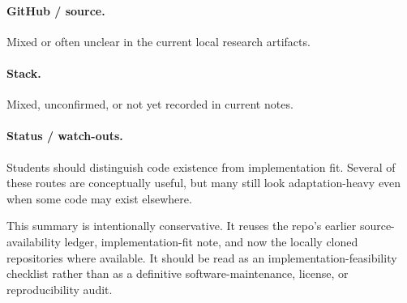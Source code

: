 \documentclass[11pt]{report}
\begin{document}
\paragraph{GitHub / source.}
Mixed or often unclear in the current local research artifacts.

\paragraph{Stack.}
Mixed, unconfirmed, or not yet recorded in current notes.

\paragraph{Status / watch-outs.}
Students should distinguish code existence from implementation fit.  Several of
these routes are conceptually useful, but many still look adaptation-heavy even
when some code may exist elsewhere.

This summary is intentionally conservative.  It reuses the repo's earlier
source-availability ledger, implementation-fit note, and now the locally cloned
repositories where available.  It should be read as an implementation-feasibility
checklist rather than as a definitive software-maintenance, license, or
reproducibility audit.
\end{document}
